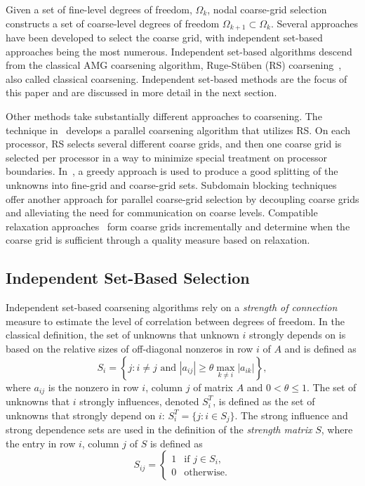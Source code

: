 \documentclass{elsart}
\begin{document}
Given a set of fine-level degrees of freedom, $\Omega_k$, nodal
coarse-grid selection constructs a set of coarse-level degrees of
freedom $\Omega_{k+1} \subset \Omega_k$. Several approaches have been
developed to select the coarse grid, with independent set-based
approaches being the most numerous. Independent set-based algorithms
descend from the classical AMG coarsening algorithm, Ruge-St\"uben
(RS) coarsening~\cite{Ruge1987}, also called classical
coarsening. Independent set-based methods are the focus of this paper and are
discussed in more detail in the next section.

Other methods take substantially different approaches to
coarsening. The technique in~\cite{Griebel2006} develops a parallel
coarsening algorithm that utilizes RS. On each processor, RS selects
several different coarse grids, and then one coarse grid is selected
per processor in a way to minimize special treatment on processor
boundaries. In~\cite{MacLachlan2006}, a greedy approach is used to
produce a good splitting of the unknowns into fine-grid and
coarse-grid sets. Subdomain blocking techniques~\cite{Krechel2001}
offer another approach for parallel coarse-grid selection by
decoupling coarse grids and alleviating the need for communication on
coarse levels. Compatible relaxation
approaches~\cite{Brandt2000,Livne2004,Brannick2005} form coarse grids
incrementally and determine when the coarse grid is sufficient through
a quality measure based on relaxation.

\subsection{Independent Set-Based Selection}
\label{sec:indep-set-based}
Independent set-based coarsening algorithms rely on a \emph{strength
  of connection} measure to estimate the level of correlation between
  degrees of freedom. In the classical definition, the set of unknowns
  that unknown $i$ strongly depends on is based on the relative sizes
  of off-diagonal nonzeros in row $i$ of $A$ and is defined as
\begin{equation}
\label{2:eqn:S_i}
S_i = \left\{j: i \ne j \textrm{ and }|a_{ij}| \ge \theta \max_{k \ne
i}|a_{ik}|\right\},
\end{equation}
where $a_{ij}$ is the nonzero in row $i$, column $j$ of matrix $A$ and
$0 < \theta \le 1$. The set of unknowns that $i$ strongly influences,
denoted $S_i^T$, is defined as the set of unknowns that strongly
depend on $i$: $S_i^T = \{j: i \in S_j\}$. The strong influence and
strong dependence sets are used in the definition of the
\emph{strength matrix} $S$, where the entry in row $i$, column $j$ of
$S$ is defined as
\begin{equation}
S_{ij} = \left\{
\begin{array}{ll}
  1 & \textrm{if } j \in S_i, \\
  0 & \textrm{otherwise}.
\end{array}\right.
\end{equation}
\end{document}
